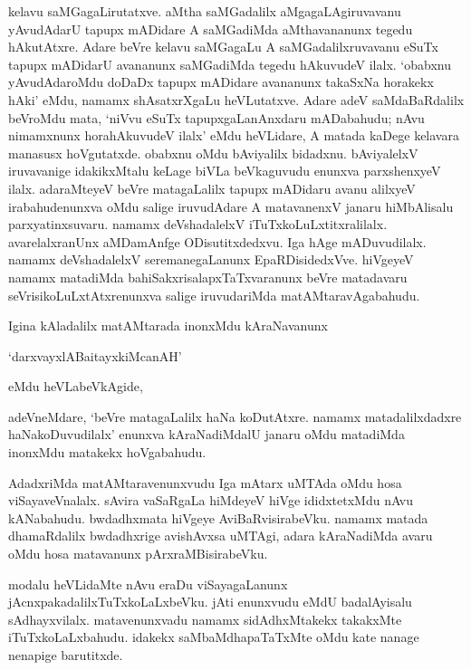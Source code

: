 kelavu saMGagaLirutatxve. aMtha saMGadalilx aMgagaLAgiruvavanu yAvudAdarU tapupx mADidare A saMGadiMda aMthavananunx tegedu hAkutAtxre. Adare beVre kelavu saMGagaLu A saMGadalilxruvavanu eSuTx tapupx mADidarU avananunx saMGadiMda tegedu hAkuvudeV ilalx. `obabxnu yAvudAdaroMdu doDaDx tapupx mADidare avananunx takaSxNa horakekx hAki' eMdu, namamx shAsatxrXgaLu heVLutatxve. Adare adeV saMdaBaRdalilx beVroMdu mata, `niVvu eSuTx tapupxgaLanAnxdaru mADabahudu; nAvu nimamxnunx horahAkuvudeV ilalx' eMdu heVLidare, A matada kaDege kelavara manasusx hoVgutatxde. obabxnu oMdu bAviyalilx bidadxnu. bAviyalelxV iruvavanige idakikxMtalu keLage biVLa beVkaguvudu enunxva parxshenxyeV ilalx. adaraMteyeV beVre matagaLalilx tapupx mADidaru avanu alilxyeV irabahudenunxva oMdu salige iruvudAdare A matavanenxV janaru hiMbAlisalu parxyatinxsuvaru. namamx deVshadalelxV iTuTxkoLuLxtitxralilalx. avarelalxranUnx aMDamAnfge ODisutitxdedxvu. Iga hAge mADuvudilalx. namamx deVshadalelxV seremanegaLanunx EpaRDisidedxVve. hiVgeyeV namamx matadiMda 
bahiSakxrisalapxTaTxvaranunx beVre matadavaru seVrisikoLuLxtAtxrenunxva salige iruvudariMda matAMtaravAgabahudu.

Igina kAladalilx matAMtarada inonxMdu kAraNavanunx

`darxvayxlABaitayxkiMcanAH'

 eMdu heVLabeVkAgide,
 
adeVneMdare, `beVre matagaLalilx haNa koDutAtxre. namamx matadalilxdadxre haNakoDuvudilalx' enunxva kAraNadiMdalU janaru oMdu matadiMda inonxMdu matakekx hoVgabahudu.

AdadxriMda matAMtaravenunxvudu Iga mAtarx uMTAda oMdu hosa viSayaveVnalalx. sAvira vaSaRgaLa hiMdeyeV hiVge ididxtetxMdu nAvu kANabahudu. bwdadhxmata hiVgeye AviBaRvisirabeVku. namamx matada dhamaRdalilx bwdadhxrige avishAvxsa uMTAgi, adara kAraNadiMda avaru oMdu 
hosa matavanunx pArxraMBisirabeVku.

modalu heVLidaMte nAvu eraDu viSayagaLanunx jAcnxpakadalilxTuTxkoLaLxbeVku. jAti enunxvudu eMdU badalAyisalu sAdhayxvilalx. matavenunxvadu namamx sidAdhxMtakekx takakxMte iTuTxkoLaLxbahudu. idakekx saMbaMdhapaTaTxMte oMdu kate nanage nenapige barutitxde.

